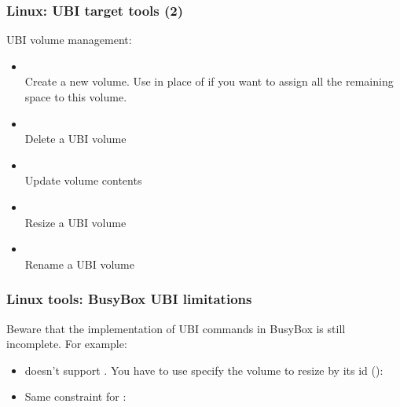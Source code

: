 \begin{frame}
  \frametitle{Linux: UBI target tools (2)}
  UBI volume management:
    \begin{itemize}
    \item {\small {}}\\
	Create a new volume. Use  in place of 
	if you want to assign all the remaining space to this volume.
    \item {\small {}}\\
	Delete a UBI volume
    \item {\small {}}\\
	Update volume contents
    \item {\small {}}\\
	Resize a UBI volume
    \item {\small {}}\\
	Rename a UBI volume
    \end{itemize}
\end{frame}

\begin{frame}
  \frametitle{Linux tools: BusyBox UBI limitations}
  Beware that the implementation of UBI commands in BusyBox is still
  incomplete. For example:
  \begin{itemize}
    \item {} doesn't support . You have
      to use specify the volume to resize by its id ():\\
    \item Same constraint for :\\
    \end{itemize}
\end{frame} 


